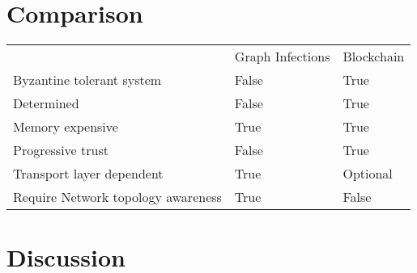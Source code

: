 \documentclass[nostrict]{szablonPG}
\begin{document}
\section{Comparison}
\begin{table}[]
\begin{tabular}{lll}
                                   & Graph Infections & Blockchain \\
Byzantine tolerant system          & False            & True       \\
Determined                         & False            & True       \\
Memory expensive                   & True             & True       \\
Progressive trust                  & False            & True       \\
Transport layer dependent          & True             & Optional   \\
Require Network topology awareness & True             & False     
\end{tabular}
\end{table}


\section{Discussion}



\end{document}

